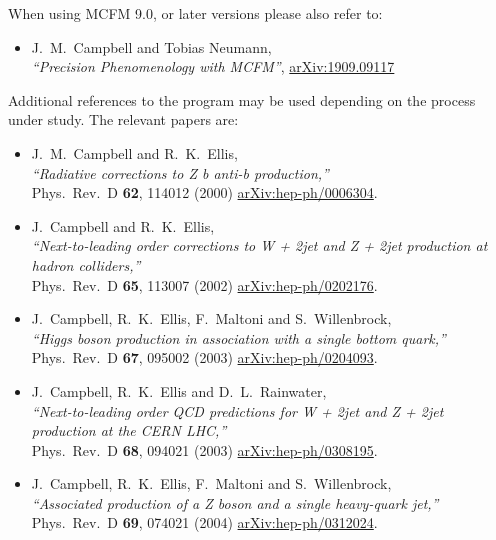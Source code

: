 When using MCFM 9.0, or later versions please also refer to:
\begin{itemize}
\item J.~M.~Campbell and Tobias Neumann, \\
       {\it ``Precision Phenomenology with MCFM''},
  \href{https://arxiv.org/abs/1909.09117}{arXiv:1909.09117}
\end{itemize}

Additional references to the program may be used depending on the process under study. The relevant papers are:
\begin{itemize}
\item J.~M.~Campbell and R.~K.~Ellis, \\
  {\it ``Radiative corrections to Z b anti-b production,''} \\
  Phys.\ Rev.\ D {\bf 62}, 114012 (2000)
  \href{https://arxiv.org/abs/hep-ph/0006304}{arXiv:hep-ph/0006304}.
%
\item J.~Campbell and R.~K.~Ellis, \\
  {\it ``Next-to-leading order corrections to W + 2jet and Z + 2jet production  at hadron colliders,''} \\
  Phys.\ Rev.\ D {\bf 65}, 113007 (2002)
  \href{https://arxiv.org/abs/hep-ph/0202176}{arXiv:hep-ph/0202176}.
%
\item J.~Campbell, R.~K.~Ellis, F.~Maltoni and S.~Willenbrock, \\
  {\it ``Higgs boson production in association with a single bottom quark,''} \\
  Phys.\ Rev.\ D {\bf 67}, 095002 (2003)
  \href{https://arxiv.org/abs/hep-ph/0204093}{arXiv:hep-ph/0204093}.
%
\item J.~Campbell, R.~K.~Ellis and D.~L.~Rainwater, \\
  {\it ``Next-to-leading order QCD predictions for W + 2jet and Z + 2jet  production at the CERN LHC,''} \\
  Phys.\ Rev.\ D {\bf 68}, 094021 (2003)
  \href{https://arxiv.org/abs/hep-ph/0308195}{arXiv:hep-ph/0308195}.
%
\item J.~Campbell, R.~K.~Ellis, F.~Maltoni and S.~Willenbrock, \\
  {\it ``Associated production of a Z boson and a single heavy-quark jet,''} \\
  Phys.\ Rev.\ D {\bf 69}, 074021 (2004)
  \href{https://arxiv.org/abs/hep-ph/0312024}{arXiv:hep-ph/0312024}.

\end{itemize}
